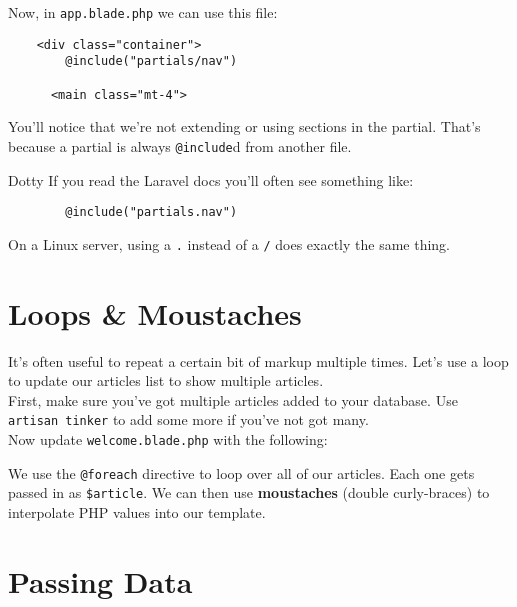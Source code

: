 
Now, in \texttt{app.blade.php} we can use this file:

\begin{verbatim}
    <div class="container">
        @include("partials/nav")

      <main class="mt-4">
\end{verbatim}

You'll notice that we're not extending or using sections in the partial. That's because a partial is always \texttt{@include}d from another file.


\begin{infobox}{Dotty}
    If you read the Laravel docs you'll often see something like:

    \begin{verbatim}
        @include("partials.nav")
    \end{verbatim}

    On a Linux server, using a \texttt{.} instead of a \texttt{/} does exactly the same thing.
\end{infobox}



\section{Loops \& Moustaches}

It's often useful to repeat a certain bit of markup multiple times. Let's use a loop to update our articles list to show multiple articles.
\\

First, make sure you've got multiple articles added to your database. Use \texttt{artisan tinker} to add some more if you've not got many.
\\

Now update \texttt{welcome.blade.php} with the following:


We use the \texttt{@foreach} directive to loop over all of our articles. Each one gets passed in as \texttt{\$article}. We can then use \textbf{moustaches} (double curly-braces) to interpolate PHP values into our template.

\section{Passing Data}

